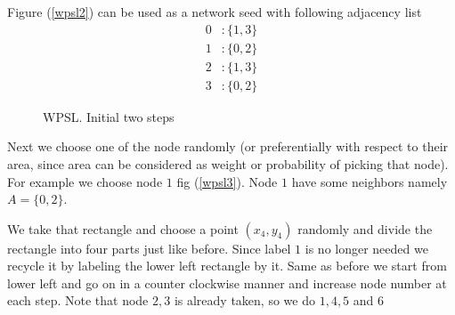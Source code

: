 \documentclass[10pt,a4paper]{report}
\begin{document}
	Figure (\ref{wpsl2}) can be used as a network seed with following adjacency list
	\begin{align}
		0 &: \{1, 3\} \\
		1 &: \{0, 2\} \\
		2 &: \{1, 3\} \\
		3 &: \{0, 2\}
	\end{align}
	\begin{figure}
		\centering
		\caption{WPSL. Initial two steps}
	\end{figure}

	Next we choose one of the node randomly (or preferentially with respect to their area, since area can be considered as weight or probability of picking that node). For example we choose node $1$ fig (\ref{wpsl3}). Node $1$ have some neighbors namely $A=\{0, 2\}$.
	
	We take that rectangle and choose a point $(x_4,y_4)$ randomly and divide the rectangle into four parts just like before. Since label $1$ is no longer needed we recycle it by labeling the lower left rectangle by it. Same as before we start from lower left and go on in a counter clockwise manner and increase node number at each step. Note that node $2,3$ is already taken, so we do $1,4,5$ and $6$
	
\end{document}
